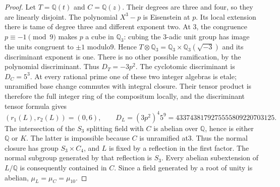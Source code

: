 \begin{proof}
Let $T=\mathbb Q(t)$ and $C=\mathbb Q(z)$.  Their degrees are three
and four, so they are linearly disjoint.  The polynomial $X^3-p$ is
Eisenstein at $p$.  Its local extension there is tame of degree three
and different exponent two.  At $3$, the congruence
$p\equiv-1\pmod9$ makes $p$ a cube in $\mathbb Q_3$: cubing the
$3$-adic unit group has image the units congruent to $\pm1$ modulo9.
Hence $T\otimes\mathbb Q_3=\mathbb Q_3\times\mathbb Q_3(\sqrt{-3})$
and its discriminant exponent is one.  There is no other possible
ramification, by the polynomial discriminant.  Thus
$D_T=-3p^2$.  The cyclotomic discriminant is $D_C=5^3$.
At every rational prime one of these two integer algebras is etale;
unramified base change commutes with integral closure.  Their tensor
product is therefore the full integer ring of the compositum locally,
and the discriminant tensor formula gives
\[
 (r_1(L),r_2(L))=(0,6),\qquad
 D_L=(3p^2)^4 5^9=4337438179275555809220703125.
 \tag{QCC.2}
\]
The intersection of the $S_3$ splitting field with $C$ is abelian
over $\mathbb Q$, hence is either $\mathbb Q$ or $K$.  The latter
is impossible because $C$ is unramified at3.  Thus the normal closure
has group $S_3\times C_4$, and $L$ is fixed by a reflection in the
first factor.  The normal subgroup generated by
that reflection is $S_3$.  Every abelian subextension of $L/\mathbb Q$
is consequently contained in $C$.  Since a field generated by a
root of unity is abelian, $\mu_L=\mu_C=\mu_{10}$.


\end{proof}
